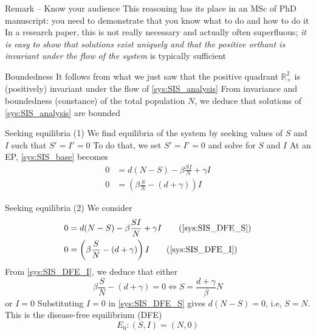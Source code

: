 \documentclass[aspectratio=43]{beamer}
\begin{document}
\begin{frame}{Remark -- Know your audience} 
This reasoning has its place in an MSc of PhD manuscript: you need to demonstrate that you know what to do and how to do it
\vfill
In a research paper, this is not really necessary and actually often superfluous; \emph{it is easy to show that solutions exist uniquely and that the positive orthant is invariant under the flow of the system} is typically sufficient
\end{frame}

\begin{frame}{Boundedness}
It follows from what we just saw that the positive quadrant $\mathbb{R}_+^2$ is (positively) invariant under the flow of \eqref{sys:SIS_analysis}
\vfill
From invariance and boundedness (constance) of the total population $N$, we deduce that solutions of \eqref{sys:SIS_analysis} are bounded
\end{frame}

\begin{frame}{Seeking equilibria (1)}
We find equilibria of the system by seeking values of $S$ and $I$ such that $S'=I'=0$
\vfill
To do that, we set $S'=I'=0$ and solve for $S$ and $I$
\vfill
At an EP, \eqref{sys:SIS_base} becomes
\begin{subequations}\label{sys:SIS_DFE}
  \begin{align}
    0 &= d(N-S)-\beta\frac{SI}{N}+\gamma I 
    \label{sys:SIS_DFE_S} \\
    0 &= \left(\beta \frac SN-(d+\gamma)\right)I 
    \label{sys:SIS_DFE_I}
  \end{align}
\end{subequations}
\end{frame}

\begin{frame}{Seeking equilibria (2)}
We consider
\begin{align}
0 &= d(N-S)-\beta\frac{SI}{N}+\gamma I 
\tag{\ref{sys:SIS_DFE_S}} \\
0 &= \left(\beta \frac SN-(d+\gamma)\right)I 
\tag{\ref{sys:SIS_DFE_I}}
\end{align}
\vfill
From \eqref{sys:SIS_DFE_I}, we deduce that either
\[
\beta\frac SN -(d+\gamma)=0
\iff S=\frac{d+\gamma}\beta N
\]
or $I=0$
\vfill
Substituting $I=0$ in \eqref{sys:SIS_DFE_S} gives $d(N-S)=0$, i.e, $S=N$. This is the disease-free equilibrium (DFE)
\begin{equation}
\label{eq:SIS_DFE}
E_0 : (S,I)=(N,0)
\end{equation}
\end{frame}
\end{document}
